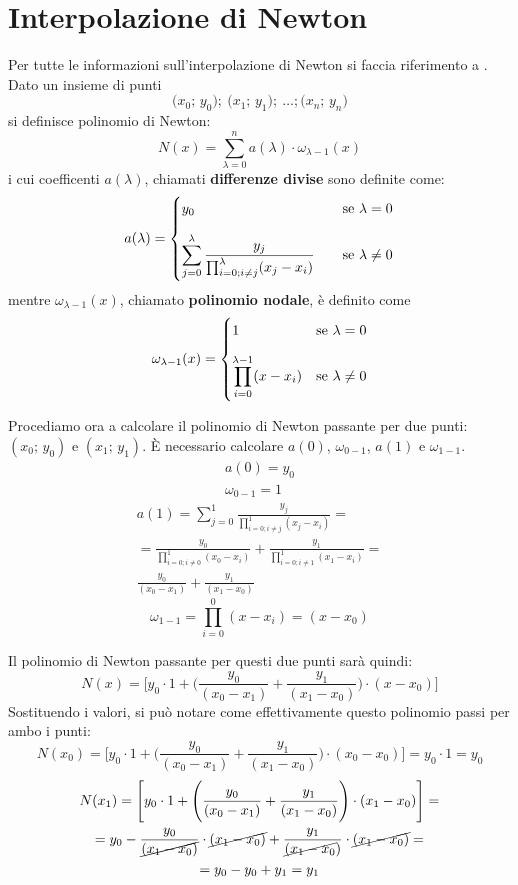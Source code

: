 \section{Interpolazione di Newton}

Per tutte le informazioni sull'interpolazione di Newton si faccia riferimento a \parencite[85]{info}. Dato un insieme di punti
\[
\big(x_0;\,y_0\big);\:\big(x_1;\,y_1\big);\:\dots;\big(x_n;\,y_n\big)
\]
si definisce polinomio di Newton:
\begin{equation}
N(x)=\sum_{\lambda=0}^n a(\lambda)\cdot \omega_{\lambda-1}(x)
\end{equation}
i cui coefficenti $a(\lambda)$, chiamati \textbf{differenze divise} sono definite come:
\[
a(\lambda)=\begin{cases}
y_0\quad&\text{se }\lambda=0\vspace{1em}\\
\displaystyle\sum_{j=0}^{\lambda}\frac{y_j}{\prod_{i=0; i\neq j}^{\lambda}(x_j-x_i)}\quad&\text{se }\lambda\neq 0
\end{cases}
\]
mentre $\omega_{\lambda-1}(x)$, chiamato \textbf{polinomio nodale}, è definito come
\[
\omega_{\lambda-1}(x)=\begin{cases}
1\quad&\text{se }\lambda=0\vspace{1em}\\
\displaystyle\prod_{i=0}^{\lambda-1}(x-x_i)&\text{se }\lambda\neq0
\end{cases}
\]

Procediamo ora a calcolare il polinomio di Newton passante per due punti: $(x_0;\,y_0)$ e $(x_1;\,y_1)$. È necessario calcolare $a(0)$, $\omega_{0-1}$, $a(1)$ e $\omega_{1-1}$.
\begin{gather*}
a(0)=y_0\\
\omega_{0-1}=1
\end{gather*}
\begin{multline*}
a(1)=\displaystyle\sum_{j=0}^{1}\frac{y_j}{\prod_{i=0; i\neq j}^{1}(x_j-x_i)}=\\
=\frac{y_0}{\prod_{i=0; i\neq 0}^{1}(x_0-x_i)}+\frac{y_1}{\prod_{i=0; i\neq 1}^{1}(x_1-x_i)}=\\
\frac{y_0}{(x_0-x_1)}+\frac{y_1}{(x_1-x_0)}
\end{multline*}
\[
\omega_{1-1}=\displaystyle\prod_{i=0}^{0}(x-x_i)=(x-x_0)
\]

Il polinomio di Newton passante per questi due punti sarà quindi:
\[
N(x)=\Bigg[y_0\cdot1+\Bigg(\frac{y_0}{(x_0-x_1)}+\frac{y_1}{(x_1-x_0)}\Bigg)\cdot(x-x_0)\Bigg]
\]
Sostituendo i valori, si può notare come effettivamente questo polinomio passi per ambo i punti:
\[
N(x_0)=\Bigg[y_0\cdot1+\Bigg(\frac{y_0}{(x_0-x_1)}+\frac{y_1}{(x_1-x_0)}\Bigg)\cdot(x_0-x_0)\Bigg]=y_0\cdot1=y_0
\]
\begin{multline*}
N(x_1)=\Bigg[y_0\cdot1+\Bigg(\frac{y_0}{(x_0-x_1)}+\frac{y_1}{(x_1-x_0)}\Bigg)\cdot(x_1-x_0)\Bigg]=\\
=y_0-\frac{y_0}{\cancel{(x_1-x_0)}}\cdot\cancel{(x_1-x_0)}+\frac{y_1}{\cancel{(x_1-x_0})}\cdot\cancel{(x_1-x_0)}=\\
=y_0-y_0+y_1=y_1
\end{multline*}

